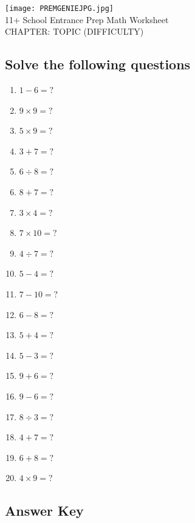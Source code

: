\documentclass{article}
\begin{document}
\begin{center}
\texttt{[image: PREMGENIEJPG.jpg]}\\
{\Large 11+ School Entrance Prep Math Worksheet}\\
{\Medium CHAPTER: TOPIC (DIFFICULTY)}\\

\end{center}

\subsection*{Solve the following questions}

\begin{enumerate}
\item $\displaystyle {1}-{6}= ? $ \
\item $\displaystyle {9}\times{9}= ? $ \
\item $\displaystyle {5}\times{9}= ? $ \
\item $\displaystyle {3}+{7}= ? $ \
\item $\displaystyle {6}\div{8}= ? $ \
\item $\displaystyle {8}+{7}= ? $ \
\item $\displaystyle {3}\times{4}= ? $ \
\item $\displaystyle {7}\times{10}= ? $ \
\item $\displaystyle {4}\div{7}= ? $ \
\item $\displaystyle {5}-{4}= ? $ \
\item $\displaystyle {7}-{10}= ? $ \
\item $\displaystyle {6}-{8}= ? $ \
\item $\displaystyle {5}+{4}= ? $ \
\item $\displaystyle {5}-{3}= ? $ \
\item $\displaystyle {9}+{6}= ? $ \
\item $\displaystyle {9}-{6}= ? $ \
\item $\displaystyle {8}\div{3}= ? $ \
\item $\displaystyle {4}+{7}= ? $ \
\item $\displaystyle {6}+{8}= ? $ \
\item $\displaystyle {4}\times{9}= ? $ \


\end{enumerate}

\newpage

\subsection*{Answer Key}
\end{document}
